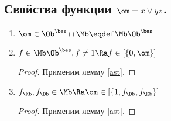 \documentclass[unicode, 10pt, a4paper, oneside, fleqn]{article}
\begin{document}
\subsection{Свойства функции $\om=x\vee yz$.}
\begin{enumerate}
 \item 
   \begin{math}
     \om \in \Oib\cap\Mb \eqdef \Mb\Oib
   \end{math}
 \item 
   \begin{lemma}
     \begin{math}
       f \in \Mb\Oib, f \ne 1 \Ra f \in \cls{0,\om}
     \end{math}
   \end{lemma}
   \begin{proof}
     Применим лемму \ref{ast}. \THEN
   \end{proof}
 \item 
   \begin{lemma}
     \begin{math}
       \fK,\fD \in \Mb \Ra \om \in \cls{1, \fD, \fK}
     \end{math}
   \end{lemma}
   \begin{proof}
     Применим лемму \ref{ast}. \THEN
   \end{proof}
\end{enumerate}
\end{document}
